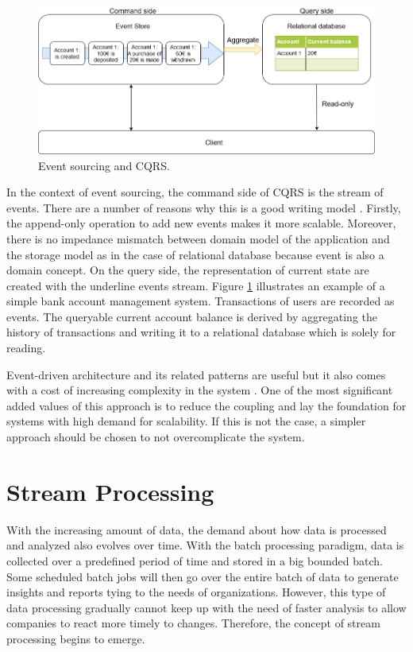 \begin{figure}[h]
	\centering
	\includegraphics[width=14cm]{images/cqrs.png}
	\caption{Event sourcing and CQRS.}
	\label{fig:cqrs}
\end{figure}

In the context of event sourcing, the command side of CQRS is the stream of events. There are a number of reasons why this is a good writing model \cite{cqrsgregyoung}. Firstly, the append-only operation to add new events makes it more scalable. Moreover, there is no impedance mismatch between domain model of the application and the storage model as in the case of relational database because event is also a domain concept. On the query side, the representation of current state are created with the underline events stream. Figure \ref{fig:cqrs} illustrates an example of a simple bank account management system. Transactions of users are recorded as events. The queryable current account balance is derived by aggregating the history of transactions and writing it to a relational database which is solely for reading.

Event-driven architecture and its related patterns are useful but it also comes with a cost of increasing complexity in the system \cite{eventsourcingishard}. One of the most significant added values of this approach is to reduce the coupling and lay the foundation for systems with high demand for scalability. If this is not the case, a simpler approach should be chosen to not overcomplicate the system.




\section{Stream Processing} \label{section:eventstreamprocessing}
With the increasing amount of data, the demand about how data is processed and analyzed also evolves over time. With the batch processing paradigm, data is collected over a predefined period of time and stored in a big bounded batch. Some scheduled batch jobs will then go over the entire batch of data to generate insights and reports tying to the needs of organizations. However, this type of data processing gradually cannot keep up with the need of faster analysis to allow companies to react more timely to changes. Therefore, the concept of stream processing begins to emerge.


